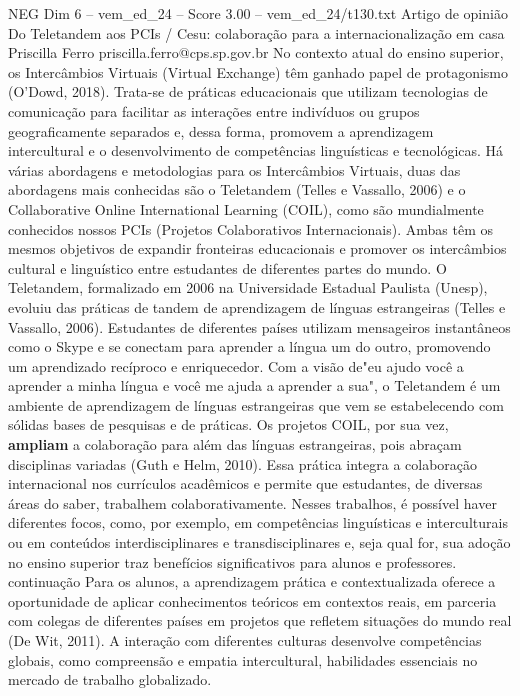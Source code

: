 \begin{textsample}{NEG Dim 6 – vem\_ed\_24 – Score 3.00 – vem\_ed\_24/t130.txt}  \label{ex:f6_neg_105}
Artigo de opinião Do Teletandem aos PCIs / Cesu: colaboração para a internacionalização em casa Priscilla Ferro priscilla.ferro@cps.sp.gov.br No contexto atual do ensino superior, os Intercâmbios Virtuais (Virtual Exchange) têm ganhado papel de protagonismo (O'Dowd, 2018).
Trata-se de práticas educacionais que utilizam tecnologias de comunicação para facilitar as interações entre indivíduos ou grupos geograficamente separados e, dessa forma, promovem a aprendizagem intercultural e o desenvolvimento de competências linguísticas e tecnológicas.
Há várias abordagens e metodologias para os Intercâmbios Virtuais, duas das abordagens mais conhecidas são o Teletandem (Telles e Vassallo, 2006) e o Collaborative Online International Learning (COIL), como são mundialmente conhecidos nossos PCIs (Projetos Colaborativos Internacionais).
Ambas têm os mesmos objetivos de expandir fronteiras educacionais e promover os intercâmbios cultural e linguístico entre estudantes de diferentes partes do mundo.
O Teletandem, formalizado em 2006 na Universidade Estadual Paulista (Unesp), evoluiu das práticas de tandem de aprendizagem de línguas estrangeiras (Telles e Vassallo, 2006).
Estudantes de diferentes países utilizam mensageiros instantâneos como o Skype e se conectam para aprender a língua um do outro, promovendo um aprendizado recíproco e enriquecedor.
Com a visão de"eu ajudo você a aprender a minha língua e você me ajuda a aprender a sua", o Teletandem é um ambiente de aprendizagem de línguas estrangeiras que vem se estabelecendo com sólidas bases de pesquisas e de práticas.
Os projetos COIL, por sua vez, \textbf{ampliam} a colaboração para além das línguas estrangeiras, pois abraçam disciplinas variadas (Guth e Helm, 2010).
Essa prática integra a colaboração internacional nos currículos acadêmicos e permite que estudantes, de diversas áreas do saber, trabalhem colaborativamente.
Nesses trabalhos, é possível haver diferentes focos, como, por exemplo, em competências linguísticas e interculturais ou em conteúdos interdisciplinares e transdisciplinares e, seja qual for, sua adoção no ensino superior traz benefícios significativos para alunos e professores. continuação Para os alunos, a aprendizagem prática e contextualizada oferece a oportunidade de aplicar conhecimentos teóricos em contextos reais, em parceria com colegas de diferentes países em projetos que refletem situações do mundo real (De Wit, 2011).
A interação com diferentes culturas desenvolve competências globais, como compreensão e empatia intercultural, habilidades essenciais no mercado de trabalho globalizado.

\end{textsample}
